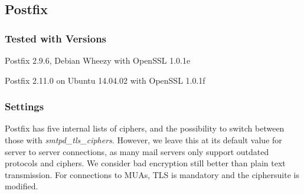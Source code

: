 

\subsection{Postfix}

\subsubsection{Tested with Versions}
\begin{itemize*}
  \item Postfix 2.9.6, Debian Wheezy with OpenSSL 1.0.1e
  \item Postfix 2.11.0 on Ubuntu 14.04.02 with OpenSSL 1.0.1f
\end{itemize*}


\subsubsection{Settings}

Postfix has five internal lists of ciphers, and the possibility to switch
between those with \emph{smtpd\_tls\_ciphers}. However, we leave this at its
default value for server to server connections, as many mail servers only
support outdated protocols and ciphers. We consider bad encryption still better
than plain text transmission. For connections to MUAs, TLS is mandatory and the
ciphersuite is modified.



